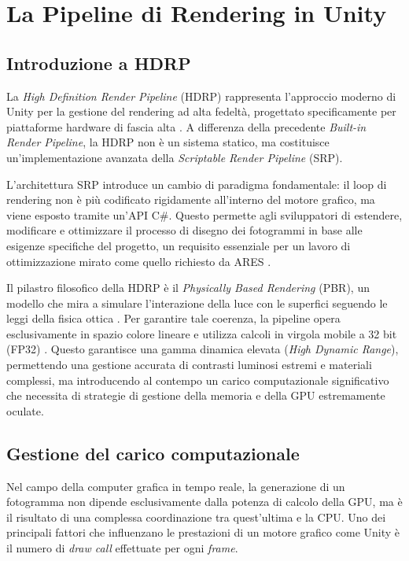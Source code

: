 \chapter{La Pipeline di Rendering in Unity}

\section{Introduzione a HDRP}

La \textit{High Definition Render Pipeline} (HDRP) rappresenta l'approccio moderno di Unity per la gestione del rendering ad alta fedeltà, progettato specificamente per piattaforme hardware di fascia alta \cite{UnityHDRP}. A differenza della precedente \textit{Built-in Render Pipeline}, la HDRP non è un sistema statico, ma costituisce un'implementazione avanzata della \textit{Scriptable Render Pipeline} (SRP). 

L'architettura SRP introduce un cambio di paradigma fondamentale: il loop di rendering non è più codificato rigidamente all'interno del motore grafico, ma viene esposto tramite un'API C\#. Questo permette agli sviluppatori di estendere, modificare e ottimizzare il processo di disegno dei fotogrammi in base alle esigenze specifiche del progetto, un requisito essenziale per un lavoro di ottimizzazione mirato come quello richiesto da ARES \cite{GregoryGameEngine}.

Il pilastro filosofico della HDRP è il \textit{Physically Based Rendering} (PBR), un modello che mira a simulare l'interazione della luce con le superfici seguendo le leggi della fisica ottica \cite{PharrPBRT}. Per garantire tale coerenza, la pipeline opera esclusivamente in spazio colore lineare e utilizza calcoli in virgola mobile a 32 bit (FP32) \cite{AkenineRealTimeRendering}. Questo garantisce una gamma dinamica elevata (\textit{High Dynamic Range}), permettendo una gestione accurata di contrasti luminosi estremi e materiali complessi, ma introducendo al contempo un carico computazionale significativo che necessita di strategie di gestione della memoria e della GPU estremamente oculate.


\section{Gestione del carico computazionale}

Nel campo della computer grafica in tempo reale, la generazione di un fotogramma non dipende esclusivamente dalla potenza di calcolo della GPU, ma è il risultato di una complessa coordinazione tra quest'ultima e la CPU. Uno dei principali fattori che influenzano le prestazioni di un motore grafico come Unity è il numero di \textit{draw call} effettuate per ogni \textit{frame}.

